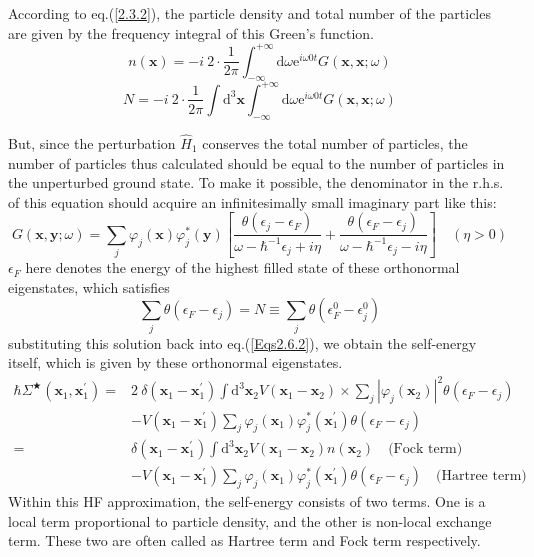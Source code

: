 According to eq.(\ref{2.3.2}), the particle density and total number of the particles are given by the frequency integral of this Green's function.
\[ n(\mathbf{x}) = - i \ 2 \cdot \frac{1}{2\pi} \int_{-\infty}^{+\infty} \mathrm{d} \omega \mathrm{e}^{i \omega  0 t} G(\mathbf{x},\mathbf{x};\omega) \]
\[ N = -i \ 2 \cdot \frac{1}{2\pi} \int \mathrm{d}^3 \mathbf{x} \int_{-\infty}^{+\infty} \mathrm{d} \omega \mathrm{e}^{i \omega  0 t} G(\mathbf{x},\mathbf{x};\omega) \]


But, since the perturbation $\hat{H}_1$ conserves the total number of particles, the number of particles thus calculated should be equal to the number of particles in the unperturbed ground state. To make it possible, the denominator in the r.h.s. of this equation should acquire an infinitesimally small imaginary part like this:
\begin{equation}\label{Eqs2.6.6}
G(\mathbf{x},\mathbf{y};\omega) = \sum_j \varphi_j(\mathbf{x}) \varphi_j^* (\mathbf{y})
\left[ \frac{\theta(\epsilon_j - \epsilon_F)}{\omega - \hbar^{-1}\epsilon_j + i \eta} + \frac{\theta(\epsilon_F - \epsilon_j)}{\omega - \hbar^{-1}\epsilon_j - i \eta} \right]   \quad (\eta > 0)
\end{equation}
$\epsilon_F $ here denotes the energy of the highest filled state of these orthonormal eigenstates, which satisfies
\[ \sum_j \theta(\epsilon_F - \epsilon_j) = N \equiv \sum_j \theta(\epsilon_F^0 - \epsilon_j^0) \]
substituting this solution back into eq.(\ref{Eqs2.6.2}), we obtain the self-energy itself, which is given by these orthonormal eigenstates.
\begin{equation}\label{Eqs2.6.7} \begin{split}
 \hbar \Sigma^\bigstar (\mathbf{x}_1,\mathbf{x}_1^{'}) =
& 2 \ \delta(\mathbf{x}_1 - \mathbf{x}_1^{'}) \int \mathrm{d}^3 \mathbf{x}_2 V(\mathbf{x}_1 - \mathbf{x}_2) \times \sum_j |\varphi_j(\mathbf{x}_2)|^2 \theta(\epsilon_F - \epsilon_j) \\
&- V(\mathbf{x}_1 - \mathbf{x}_1^{'}) \sum_j \varphi_j (\mathbf{x}_1) \varphi_j^* (\mathbf{x}_1^{'}) \theta(\epsilon_F - \epsilon_j) \\
=& \delta(\mathbf{x}_1 - \mathbf{x}_1^{'}) \int \mathrm{d}^3 \mathbf{x}_2 V(\mathbf{x}_1 - \mathbf{x}_2) n(\mathbf{x}_2) \quad \text{(Fock term)}\\
&- V(\mathbf{x}_1 - \mathbf{x}_1^{'})\sum_j \varphi_j(\mathbf{x}_1)\varphi_j^*(\mathbf{x}_1^{'})\theta(\epsilon_F - \epsilon_j) \quad \text{(Hartree term)}
\end{split}\end{equation}
Within this HF approximation, the self-energy consists of two terms. One is a local term proportional to particle density, and the other is non-local exchange term. These two are often called as Hartree term and Fock term respectively.

